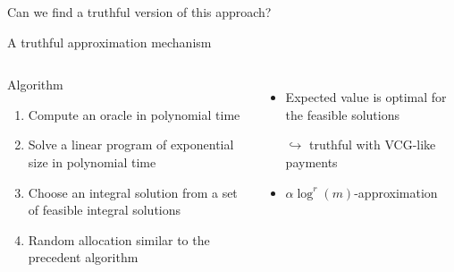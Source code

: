 \documentclass[aspectratio=169]{beamer}
\begin{document}
\begin{frame}[standout]
    Can we find a \alert{truthful version} of this approach?
\end{frame}

\begin{frame}{A truthful approximation mechanism}
    \begin{columns}



         

        \begin{block}{Algorithm}
            \begin{enumerate}
                \item Compute an oracle in polynomial time
                \item Solve a linear program of exponential size in polynomial time
                \item Choose an integral solution from a set of feasible integral solutions
                \item Random allocation similar to the precedent algorithm
            \end{enumerate}
        \end{block}



        \begin{itemize}
            \item Expected value is optimal for the feasible solutions 
            
            \(\hookrightarrow\) truthful with VCG-like payments
            \item \(\alpha \log^r(m)\)-approximation 
        \end{itemize}

    \end{columns}
\end{frame}
\end{document}
